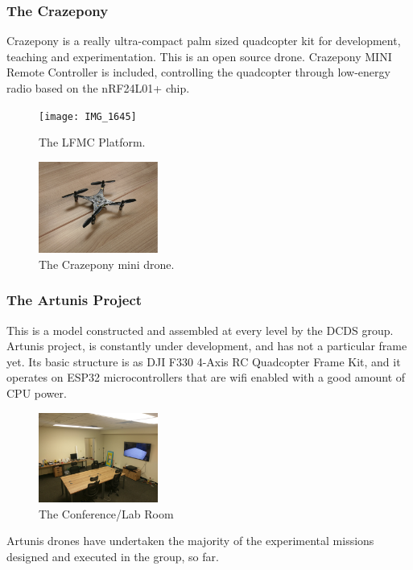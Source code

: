 \documentclass[english,letter,12pt,onesided]{article}
\theoremstyle{definition}
\begin{document}
\subsubsection*{The Crazepony} Crazepony is a really ultra-compact palm sized quadcopter kit for development, teaching and experimentation. This is an open source drone. Crazepony MINI Remote Controller is included, controlling the quadcopter through low-energy radio based on the nRF24L01+ chip.

\begin{figure}[t]
\center
    \texttt{[image: IMG\_1645]} 
    \caption*{The LFMC Platform.}
\end{figure}
\begin{figure} \vspace{-0.1in}
\center
    \includegraphics[width=0.35\textwidth]{IMAG1125} 
    \caption*{The Crazepony mini drone.}\vspace{-0.2in}
\end{figure}

\subsubsection*{The Artunis Project}
This is a model constructed and assembled at every level by the DCDS group. 
Artunis project, is constantly under development, and has not a particular frame yet. Its basic structure is as DJI F330 4-Axis RC Quadcopter Frame Kit, and it operates on ESP32 microcontrollers that are wifi enabled with a good amount of CPU power.  
 \begin{figure}\vspace{-0.2in}
\center
    \includegraphics[width=0.35\textwidth]{IMAG1115} 
    \caption*{The Conference/Lab Room}\vspace{-0.2in}
\end{figure}
Artunis drones have undertaken the majority of the experimental missions designed and executed in the group, so far. 
\end{document}
